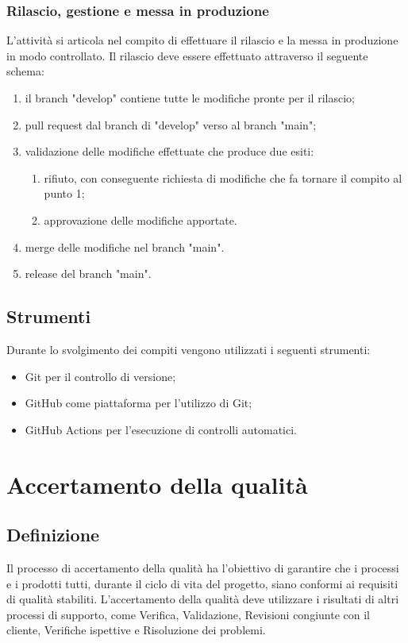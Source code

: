 \subsubsection{Rilascio, gestione e messa in produzione}
L'attività si articola nel compito di effettuare il rilascio e la messa in produzione in modo controllato. Il rilascio deve essere effettuato attraverso il seguente schema:
\begin{enumerate}
    \item il branch "develop" contiene tutte le modifiche pronte per il rilascio;
    \item pull request dal branch di "develop" verso al branch "main";
    \item validazione delle modifiche effettuate che produce due esiti:
    \begin{enumerate}
        \item rifiuto, con conseguente richiesta di modifiche che fa tornare il compito al punto 1;
        \item approvazione delle modifiche apportate.
    \end{enumerate}
    \item merge delle modifiche nel branch "main".
    \item release del branch "main".
\end{enumerate}
\subsection{Strumenti}
Durante lo svolgimento dei compiti vengono utilizzati i seguenti strumenti:
\begin{itemize}
    \item Git per il controllo di versione;
    \item GitHub come piattaforma per l'utilizzo di Git;
    \item GitHub Actions per l'esecuzione di controlli automatici.
\end{itemize}

\newpage


\section{Accertamento della qualità} \label{sec:qualità}

\subsection{Definizione}
Il processo di accertamento della qualità ha l'obiettivo di garantire che i processi e i prodotti tutti, durante il ciclo di vita del progetto, siano conformi ai requisiti di qualità stabiliti. L'accertamento della qualità deve utilizzare i risultati di altri processi di supporto, come Verifica, Validazione, Revisioni congiunte con il cliente, Verifiche ispettive e Risoluzione dei problemi.

